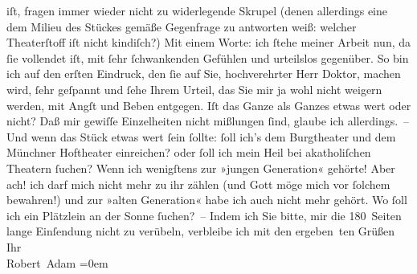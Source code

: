 \begin{ledgroupsized}[t]{13cm}
               iſt, fragen immer wieder nicht zu widerlegende Skrupel (denen allerdings eine dem
               Milieu des Stückes gemäße Gegenfrage zu antworten weiß: welcher Theaterſtoff iſt
               nicht kindiſch?) Mit einem Worte: ich ſtehe meiner Arbeit nun, da ſie vollendet iſt,
               mit ſehr ſchwankenden Gefühlen und urteilslos gegenüber.\pend
           \pstart
           So bin ich auf den erſten Eindruck, den ſie auf Sie, hochverehrter Herr Doktor,
               machen wird, ſehr geſpannt und ſehe Ihrem Urteil, das Sie mir ja wohl nicht weigern
               werden, mit Angſt und Beben entgegen. Iſt das Ganze als Ganzes etwas wert oder nicht?
               Daß mir gewiſſe Einzelheiten nicht mißlungen ſind, glaube ich allerdings. –\pend
           \pstart
           Und wenn das Stück etwas wert {\pb}ſein ſollte: ſoll ich’s
               dem Burgtheater und dem Münchner Hoftheater einreichen? oder ſoll ich mein Heil bei
               akatholiſchen Theatern ſuchen?\pend
           \pstart
           Wenn ich wenigſtens zur »jungen Generation« gehörte! Aber ach! ich darf mich nicht
               mehr zu ihr zählen (und Gott möge mich vor ſolchem bewahren!) und zur »alten
               Generation« habe ich auch nicht mehr gehört. Wo ſoll ich ein Plätzlein an der Sonne
               ſuchen? –\pend
           \pstart
           Indem ich Sie bitte, mir die 180 Seiten lange Einſendung nicht zu verübeln,
               verbleibe ich mit den ergeben ten Grüßen Ihr{\\[\baselineskip]}\spacefill\mbox{Robert Adam}\pend
           \leftskip=0em{}
         
         \endnumbering{}\end{ledgroupsized}  \newcommand{\dateiname}{L02275}\newcommand{\titel}{Robert Adam an Arthur Schnitzler, 12. 10. 1917}\newcommand{\editorInnen}{Martin Anton Müller und Gerd-Hermann Susen}
      